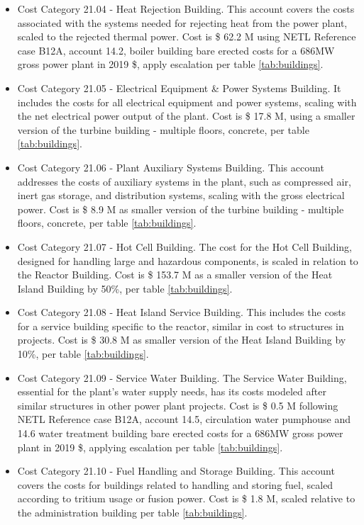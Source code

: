 \begin{itemize}
\item Cost Category 21.04 - Heat Rejection Building. This account covers the costs associated with the systems needed for rejecting heat from the power plant, scaled to the rejected thermal power. Cost is \$ 62.2 M using NETL Reference case B12A, account 14.2, boiler building bare erected costs for a 686MW gross power plant in 2019 \$, apply escalation per table \ref{tab:buildings}. 
\item Cost Category 21.05 - Electrical Equipment \& Power Systems Building. It includes the costs for all electrical equipment and power systems, scaling with the net electrical power output of the plant. Cost is \$ 17.8 M, using a smaller version of the turbine building - multiple floors, concrete, per table \ref{tab:buildings}.
\item Cost Category 21.06 - Plant Auxiliary Systems Building. This account addresses the costs of auxiliary systems in the plant, such as compressed air, inert gas storage, and distribution systems, scaling with the gross electrical power. Cost is \$ 8.9 M as smaller version of the turbine building - multiple floors, concrete, per table \ref{tab:buildings}. 
\item Cost Category 21.07 - Hot Cell Building. The cost for the Hot Cell Building, designed for handling large and hazardous components, is scaled in relation to the Reactor Building.  Cost is \$ 153.7 M as a smaller version of the Heat Island Building by 50\%, per table \ref{tab:buildings}.  
\item Cost Category 21.08 - Heat Island Service Building. This includes the costs for a service building specific to the reactor, similar in cost to structures in projects. Cost is \$ 30.8 M as smaller version of the Heat Island Building by 10\%, per table \ref{tab:buildings}.  
\item Cost Category 21.09 - Service Water Building. The Service Water Building, essential for the plant’s water supply needs, has its costs modeled after similar structures in other power plant projects. Cost is \$ 0.5 M following NETL Reference case B12A, account 14.5, circulation water pumphouse and 14.6 water treatment building bare erected costs for a 686MW gross power plant in 2019 \$, applying escalation per table \ref{tab:buildings}.
\item Cost Category 21.10 - Fuel Handling and Storage Building. This account covers the costs for buildings related to handling and storing fuel, scaled according to tritium usage or fusion power. Cost is \$ 1.8 M, scaled relative to the administration building per table \ref{tab:buildings}. 

\end{itemize}
